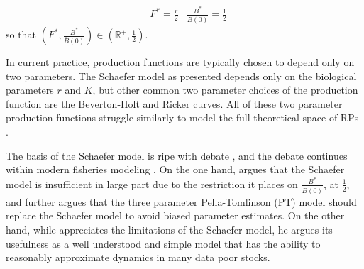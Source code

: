 \documentclass[12pt]{article}
\begin{document}
%
\begin{align}
        &F^* = \frac{r}{2}
        &\frac{B^*}{\bar B(0)} = \frac{1}{2} \label{fbLogistic}
\end{align}
so that $\left(F^*, \frac{B^*}{\bar B(0)}\right)\in \left(\mathbb{R}^+, \frac{1}{2}\right)$.

%
In current practice, production functions are typically chosen to depend only 
on two parameters. The Schaefer model as presented depends only on
the biological parameters $r$ and $K$, but other common two parameter choices
of the production function are the Beverton-Holt  
and Ricker  curves. All of these two parameter 
production functions struggle similarly to model the full theoretical space of 
RPs .

The basis of the Schaefer model is ripe with debate , 
and the debate continues within modern fisheries modeling . 
On the one hand,  argues that the Schaefer model is 
insufficient in large part due to the restriction it places on $\frac{B^*}{\bar B(0)}$, 
at $\frac{1}{2}$, and further argues that the three parameter Pella-Tomlinson 
(PT) model  should replace the Schaefer model to avoid biased parameter 
estimates. On the other hand, while  appreciates 
the limitations of the Schaefer model, he argues its usefulness as a well 
understood and simple model that has the ability to reasonably 
approximate dynamics in many data poor stocks. %

%
%
%
%
\end{document}
